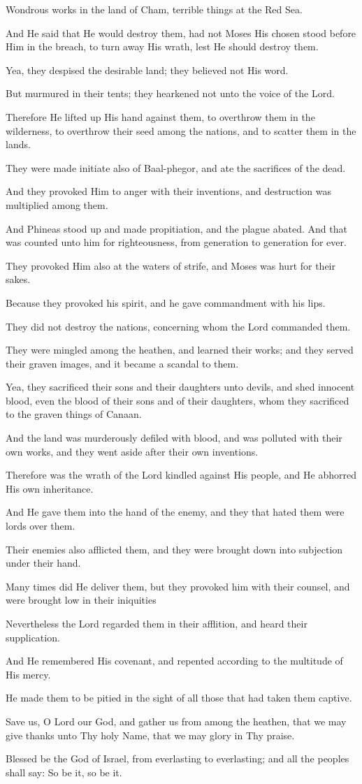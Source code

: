 Wondrous works in the land of Cham, terrible things at the Red Sea.

And He said that He would destroy them, had not Moses His chosen stood before Him in the breach, to turn away His wrath, lest He should destroy them.

Yea, they despised the desirable land; they believed not His
word.

But murmured in their tents; they hearkened not unto the voice of the Lord.

Therefore He lifted up His hand against them, to overthrow them in the wilderness, to overthrow their seed among the nations, and to scatter them in the lands.

They were made initiate also of Baal-phegor, and ate the sacrifices of the dead.

And they provoked Him to anger with their inventions, and destruction was multiplied among them.

And Phineas stood up and made propitiation, and the plague abated. And that was counted unto him for righteousness, from generation to generation for ever.

They provoked Him also at the waters of strife, and Moses was hurt for their sakes.

Because they provoked his spirit, and he gave commandment with his lips.

They did not destroy the nations, concerning whom the Lord commanded them.

They were mingled among the heathen, and learned their works; and they served their graven images, and it became a scandal to them.

Yea, they sacrificed their sons and their daughters unto devils, and shed innocent blood, even the blood of their sons and of their daughters, whom they sacrificed to the graven things of Canaan.

And the land was murderously defiled with blood, and was polluted with their own works, and they went aside after their own inventions.

Therefore was the wrath of the Lord kindled against His people, and He abhorred His own inheritance.

And He gave them into the hand of the enemy, and they that hated them were lords over them.

Their enemies also afflicted them, and they were brought down into subjection under their hand.

Many times did He deliver them, but they provoked him with their counsel, and were brought low in their iniquities

Nevertheless the Lord regarded them in their afflition, and heard their supplication.

And He remembered His covenant, and repented according to the multitude of His mercy.

He made them to be pitied in the sight of all those that had taken them captive.

Save us, O Lord our God, and gather us from among the heathen, that we may give thanks unto Thy holy Name, that we may glory in Thy praise.

Blessed be the God of Israel, from everlasting to everlasting; and all the peoples shall say: So be it, so be it.
